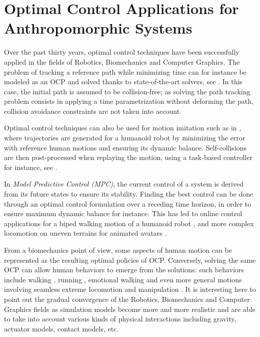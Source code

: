 \section{Optimal Control Applications for Anthropomorphic Systems}

Over the past thirty years, optimal control techniques have been
successfully applied in the fields of Robotics, Biomechanics and
Computer Graphics. The problem of tracking a reference path while
minimizing time can for instance be modeled as an OCP and solved
thanks to state-of-the-art solvers, see
\cite{bobrow1985time,verscheure2009time,suleiman2010time}. In this
case, the initial path is assumed to be collision-free; as solving the
path tracking problem consists in applying a time parametrization
without deforming the path, collision avoidance constraints are not
taken into account.

Optimal control techniques can also be used for motion imitation such
as in \cite{suleiman2008human}, where trajectories are generated for a
humanoid robot by minimizing the error with reference human motions
and ensuring its dynamic balance. Self-collisions are then
post-processed when replaying the motion, using a task-based
controller for instance, see \cite{kanehiro2008local}.

In \emph{Model Predictive Control (MPC)}, the current control of a
system is derived from its future states to ensure its
stability. Finding the best control can be done through an optimal
control formulation over a receding time horizon, in order to ensure
maximum dynamic balance for instance. This has led to online control
applications for a biped walking motion of a humanoid robot
\cite{herdt2010online}, and more complex locomotion on uneven terrains
for animated avatars \cite{coros2010generalized,tassa2012synthesis}.

From a biomechanics point of view, some aspects of human motion can be
represented as the resulting optimal policies of OCP. Conversely,
solving the same OCP can allow human behaviors to emerge from the
solutions: such behaviors include walking
\cite{chevallereau2001optimal}, running \cite{Schultz2010}, emotional
walking \cite{felis2012modeling} and even more general motions
involving seamless extreme locomotion and manipulation
\cite{mordatch2012discovery}. It is interesting here to point out the
gradual convergence of the Robotics, Biomechanics and Computer
Graphics fields as simulation models become more and more realistic
and are able to take into account various kinds of physical
interactions including gravity, actuator models, contact models, etc.

